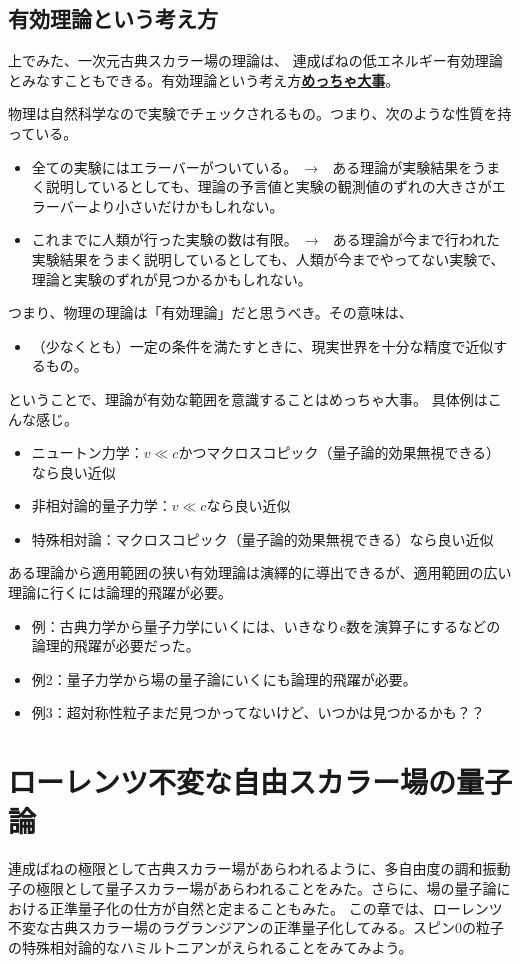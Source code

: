 \documentclass[10pt,a4paper]{jarticle}
\begin{document}
\subsection{有効理論という考え方}
上でみた、一次元古典スカラー場の理論は、
連成ばねの低エネルギー有効理論とみなすこともできる。有効理論という考え方\underline{\textbf{めっちゃ大事}}。

物理は自然科学なので実験でチェックされるもの。つまり、次のような性質を持っている。
\begin{itemize}
\item 全ての実験にはエラーバーがついている。　→　ある理論が実験結果をうまく説明しているとしても、理論の予言値と実験の観測値のずれの大きさがエラーバーより小さいだけかもしれない。
\item これまでに人類が行った実験の数は有限。　→　ある理論が今まで行われた実験結果をうまく説明しているとしても、人類が今までやってない実験で、理論と実験のずれが見つかるかもしれない。
\end{itemize}
%
つまり、物理の理論は「有効理論」だと思うべき。その意味は、
\begin{itemize}
\item （少なくとも）一定の条件を満たすときに、現実世界を十分な精度で近似するもの。
\end{itemize}
ということで、理論が有効な範囲を意識することはめっちゃ大事。
具体例はこんな感じ。
\begin{itemize}
\item ニュートン力学：$v\ll c$かつマクロスコピック（量子論的効果無視できる）なら良い近似
\item 非相対論的量子力学：$v\ll c$なら良い近似
\item 特殊相対論：マクロスコピック（量子論的効果無視できる）なら良い近似
\end{itemize}
%
ある理論から適用範囲の狭い有効理論は演繹的に導出できるが、適用範囲の広い理論に行くには論理的飛躍が必要。
\begin{itemize}
\item 例：古典力学から量子力学にいくには、いきなりc数を演算子にするなどの論理的飛躍が必要だった。
\item 例2：量子力学から場の量子論にいくにも論理的飛躍が必要。
\item 例3：超対称性粒子まだ見つかってないけど、いつかは見つかるかも？？
\end{itemize}


\section{ローレンツ不変な自由スカラー場の量子論}
連成ばねの極限として古典スカラー場があらわれるように、多自由度の調和振動子の極限として量子スカラー場があらわれることをみた。さらに、場の量子論における正準量子化の仕方が自然と定まることもみた。
この章では、ローレンツ不変な古典スカラー場のラグランジアンの正準量子化してみる。スピン0の粒子の特殊相対論的なハミルトニアンがえられることをみてみよう。
\end{document}
